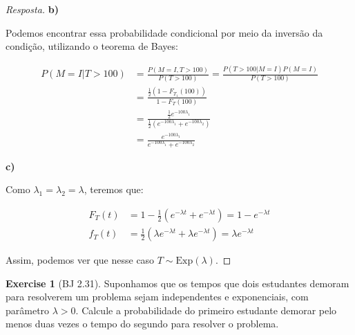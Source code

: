 \documentclass[
]{article}
\theoremstyle{definition}
\theoremstyle{definition}
\theoremstyle{definition}
\newtheorem{exercise}{Exercise}[section]
\theoremstyle{definition}
\theoremstyle{remark}
\begin{document}
\begin{proof}[Resposta]
\textbf{b)}

Podemos encontrar essa probabilidade condicional por meio da inversão da condição, utilizando o teorema de Bayes:

\begin{align*}
P(M = I|T > 100) &= \frac{P(M = I, T > 100)}{P(T > 100)} = \frac{P(T > 100|M = I)P(M = I)}{P(T > 100)} \\
&= \frac{\frac{1}{2}(1 - F_{T_{1}}(100))}{1 - F_{T}(100)} \\
&= \frac{\frac{1}{2}e^{-100\lambda_{1}}}{\frac{1}{2}\left(e^{-100\lambda_{1}} + e^{-100\lambda_{2}}\right)} \\
&= \frac{e^{-100\lambda_{1}}}{e^{-100\lambda_{1}} + e^{-100\lambda_{2}}}
\end{align*}

\textbf{c)}

Como \(\lambda_{1} = \lambda_{2} = \lambda\), teremos que:

\begin{align*}
F_{T}(t) &= 1 - \frac{1}{2}\left(e^{-\lambda t} + e^{-\lambda t}\right) = 1 - e^{-\lambda t} \\
f_{T}(t) &= \frac{1}{2}\left(\lambda e^{-\lambda t} + \lambda e^{-\lambda t}\right) = \lambda e^{-\lambda t}
\end{align*}

Assim, podemos ver que nesse caso \(T \sim \mathrm{Exp}(\lambda)\).
\end{proof}

\begin{exercise}[BJ 2.31]
Suponhamos que os tempos que dois estudantes demoram para resolverem um problema sejam independentes e exponenciais, com parâmetro \(\lambda > 0\). Calcule a probabilidade do primeiro estudante demorar pelo menos duas vezes o tempo do segundo para resolver o problema.
\end{exercise}
\end{document}

